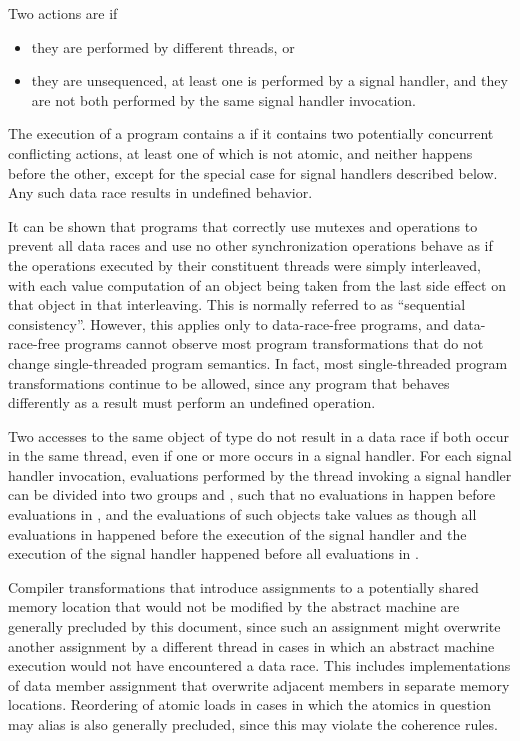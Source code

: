 \pnum
Two actions are  if
\begin{itemize}
\item they are performed by different threads, or
\item they are unsequenced, at least one is performed by a signal handler, and
they are not both performed by the same signal handler invocation.
\end{itemize}
The execution of a program contains a  if it contains two
potentially concurrent conflicting actions, at least one of which is not atomic,
and neither happens before the other,
except for the special case for signal handlers described below.
Any such data race results in undefined
behavior. \begin{note} It can be shown that programs that correctly use mutexes
and  operations to prevent all data races and use no
other synchronization operations behave as if the operations executed by their
constituent threads were simply interleaved, with each
%
value computation of an
object being taken from the last
%
side effect on that object in that
interleaving. This is normally referred to as ``sequential consistency''.
However, this applies only to data-race-free programs, and data-race-free
programs cannot observe most program transformations that do not change
single-threaded program semantics. In fact, most single-threaded program
transformations continue to be allowed, since any program that behaves
differently as a result must perform an undefined operation. \end{note}

\pnum
Two accesses to the same object of type  do not
result in a data race if both occur in the same thread, even if one or more
occurs in a signal handler. For each signal handler invocation, evaluations
performed by the thread invoking a signal handler can be divided into two
groups  and , such that no evaluations in
 happen before evaluations in , and the
evaluations of such  objects take values as though
all evaluations in  happened before the execution of the signal
handler and the execution of the signal handler happened before all evaluations
in .

\pnum
\begin{note} Compiler transformations that introduce assignments to a potentially
shared memory location that would not be modified by the abstract machine are
generally precluded by this document, since such an assignment might overwrite
another assignment by a different thread in cases in which an abstract machine
execution would not have encountered a data race. This includes implementations
of data member assignment that overwrite adjacent members in separate memory
locations. Reordering of atomic loads in cases in which the atomics in question
may alias is also generally precluded, since this may violate the coherence
rules. \end{note}

